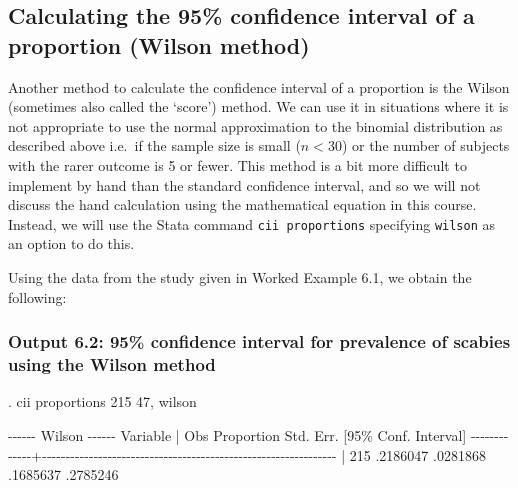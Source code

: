 \documentclass[
]{memoir}
\newenvironment{Shaded}{\begin{snugshade}}{\end{snugshade}}
\newcommand{\NormalTok}[1]{#1}
\begin{document}
\hypertarget{calculating-the-95-confidence-interval-of-a-proportion-wilson-method}{%
\subsection{Calculating the 95\% confidence interval of a proportion (Wilson method)}\label{calculating-the-95-confidence-interval-of-a-proportion-wilson-method}}

Another method to calculate the confidence interval of a proportion is the Wilson (sometimes also called the `score') method. We can use it in situations where it is not appropriate to use the normal approximation to the binomial distribution as described above i.e.~if the sample size is small (\(n < 30\)) or the number of subjects with the rarer outcome is 5 or fewer. This method is a bit more difficult to implement by hand than the standard confidence interval, and so we will not discuss the hand calculation using the mathematical equation in this course. Instead, we will use the Stata command \texttt{cii\ proportions} specifying \texttt{wilson} as an option to do this.

Using the data from the study given in Worked Example 6.1, we obtain the following:

\hypertarget{output-6.2-95-confidence-interval-for-prevalence-of-scabies-using-the-wilson-method}{%
\subsubsection{Output 6.2: 95\% confidence interval for prevalence of scabies using the Wilson method}\label{output-6.2-95-confidence-interval-for-prevalence-of-scabies-using-the-wilson-method}}

\begin{Shaded}
\begin{Highlighting}[]
\NormalTok{. cii proportions 215 47, wilson}

\NormalTok{                                                         {-}{-}{-}{-}{-}{-} Wilson {-}{-}{-}{-}{-}{-}}
\NormalTok{    Variable |        Obs  Proportion    Std. Err.       [95\% Conf. Interval]}
\NormalTok{{-}{-}{-}{-}{-}{-}{-}{-}{-}{-}{-}{-}{-}+{-}{-}{-}{-}{-}{-}{-}{-}{-}{-}{-}{-}{-}{-}{-}{-}{-}{-}{-}{-}{-}{-}{-}{-}{-}{-}{-}{-}{-}{-}{-}{-}{-}{-}{-}{-}{-}{-}{-}{-}{-}{-}{-}{-}{-}{-}{-}{-}{-}{-}{-}{-}{-}{-}{-}{-}{-}{-}{-}{-}{-}{-}{-}}
\NormalTok{             |        215    .2186047    .0281868        .1685637    .2785246}
\end{Highlighting}
\end{Shaded}
\end{document}
